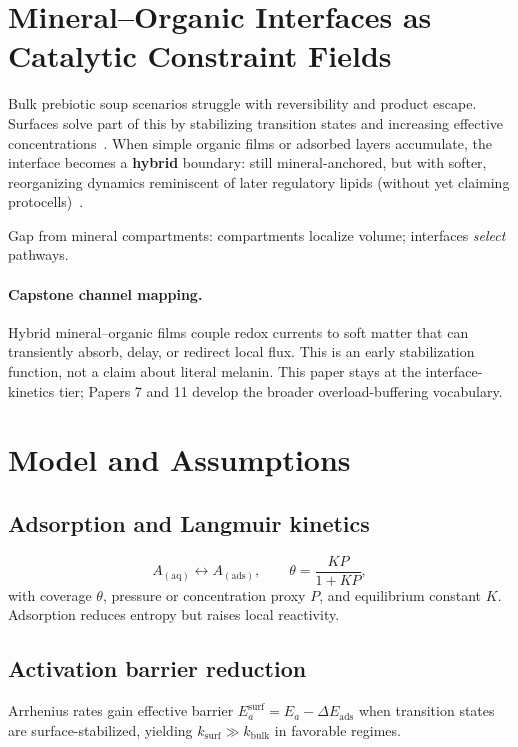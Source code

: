 \documentclass[11pt,a4paper]{article}
\begin{document}
\section{Mineral--Organic Interfaces as Catalytic Constraint Fields}
Bulk prebiotic soup scenarios struggle with reversibility and product escape. Surfaces solve part of this by stabilizing transition states and increasing effective concentrations~\cite{Wachtershauser1988}. When simple organic films or adsorbed layers accumulate, the interface becomes a \textbf{hybrid} boundary: still mineral-anchored, but with softer, reorganizing dynamics reminiscent of later regulatory lipids (without yet claiming protocells)~\cite{Szostak2010}.

Gap from mineral compartments: compartments localize volume; interfaces \emph{select} pathways.

\paragraph{Capstone channel mapping.}
Hybrid mineral--organic films couple redox currents to soft matter that can transiently absorb, delay, or redirect local flux. This is an early stabilization function, not a claim about literal melanin. This paper stays at the interface-kinetics tier; Papers 7 and 11 develop the broader overload-buffering vocabulary.

\section{Model and Assumptions}

\subsection{Adsorption and Langmuir kinetics}
\begin{equation}
A_{(\mathrm{aq})} \leftrightarrow A_{(\mathrm{ads})},\qquad
\theta = \frac{KP}{1+KP},
\end{equation}
with coverage $\theta$, pressure or concentration proxy $P$, and equilibrium constant $K$. Adsorption reduces entropy but raises local reactivity.

\subsection{Activation barrier reduction}
Arrhenius rates gain effective barrier $E_a^{\mathrm{surf}} = E_a - \Delta E_{\mathrm{ads}}$ when transition states are surface-stabilized, yielding $k_{\mathrm{surf}}\gg k_{\mathrm{bulk}}$ in favorable regimes.
\end{document}
